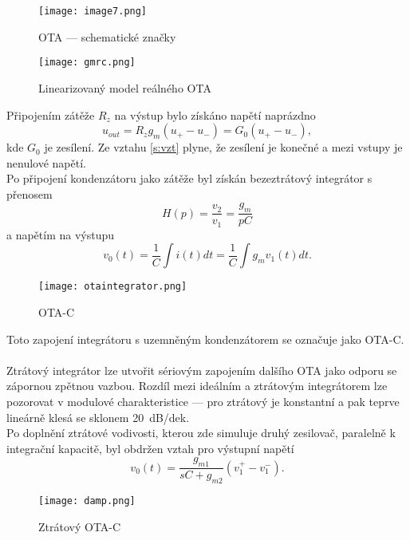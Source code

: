 \begin{figure}[h]
\centering
\texttt{[image: image7.png]}
\caption[OTA --- schematické značky]{OTA --- schematické značky \cite{14}}
\end{figure}
\begin{figure}[h]
\centering
\texttt{[image: gmrc.png]}
\caption[Linearizovaný model reálného OTA]{Linearizovaný model reálného OTA \cite{9}}
\end{figure}
\noindent Připojením zátěže $R_z$ na výstup bylo získáno napětí naprázdno
\begin{equation}\label{s:vzt}
u_{out} = R_zg_m(u_+ - u_-) = G_0(u_+ - u_-),
\end{equation}
kde $G_0$ je zesílení. Ze vztahu \ref{s:vzt} plyne, že zesílení je konečné a mezi vstupy je nenulové napětí. \\
\noindent Po připojení kondenzátoru jako zátěže byl získán bezeztrátový integrátor s přenosem
\begin{equation}
H(p) = \frac{v_2}{v_1} = \frac{g_m}{pC}
\end{equation}
\noindent a napětím na výstupu
\begin{equation}
v_0(t) = \frac{1}{C}\int i(t)dt = \frac{1}{C}\int g_mv_1(t)dt.
\end{equation}
\begin{figure}[h]
\centering
\texttt{[image: otaintegrator.png]}
\caption[OTA-C]{OTA-C \cite{9} \label{s:GM-C}}
\end{figure}
\noindent Toto zapojení integrátoru s uzemněným kondenzátorem se označuje jako OTA-C.\\
\\
Ztrátový integrátor lze utvořit sériovým zapojením dalšího OTA jako odporu se zápornou zpětnou vazbou. Rozdíl mezi ideálním a ztrátovým integrátorem lze pozorovat v modulové charakteristice --- pro ztrátový je konstantní a pak teprve lineárně klesá se sklonem 20~dB/dek.\\
Po doplnění ztrátové vodivosti, kterou zde simuluje druhý zesilovač, paralelně k integrační kapacitě, byl obdržen vztah pro výstupní napětí
\begin{equation}
v_0(t) = \frac{g_{m1}}{sC + g_{m2}}(v_1^+ - v_{1}^-).\label{s:OTA-INT1}
\end{equation}
\begin{figure}[h]
\centering
\texttt{[image: damp.png]}
\caption[Ztrátový OTA-C]{Ztrátový OTA-C \cite{9} \label{s:OTA-INT}}
\end{figure}
